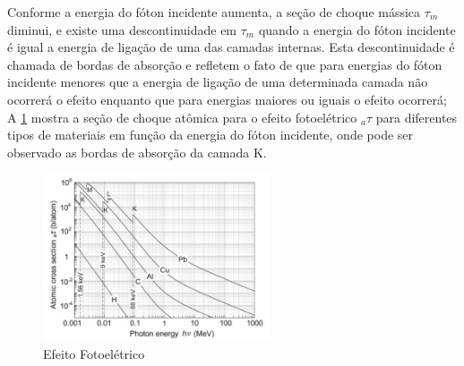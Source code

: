 \documentclass[11pt,a4paper]{article}
\begin{document}
            Conforme a energia do fóton incidente aumenta, a seção de choque mássica $\tau_m$ diminui, e existe uma descontinuidade em $\tau_m$ quando a energia do fóton incidente é igual a energia de ligação de uma das camadas internas. Esta descontinuidade é chamada de bordas de absorção e refletem o fato de que para energias do fóton incidente menores que a energia de ligação de uma determinada camada não ocorrerá o efeito enquanto que para energias maiores ou iguais o efeito ocorrerá; A \ref{fig:descontinuidadeEfeitoFotoeletrico} mostra a seção de choque atômica para o efeito fotoelétrico ${}_a\tau$ para diferentes tipos de materiais em função da energia do fóton incidente, onde pode ser observado as bordas de absorção da camada K.

            \begin{figure}[h]
                \centering
                \includegraphics[width=0.6\textwidth]{Imagens/descontinuidadeEfeitoFotoeletrico.JPG}
                \caption{Efeito Fotoelétrico}
                \label{fig:descontinuidadeEfeitoFotoeletrico}
            \end{figure}
\end{document}
